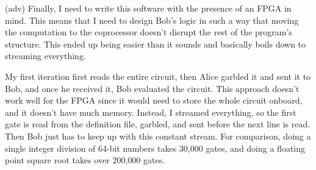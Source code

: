 \documentclass[14pt, table]{beamer}
\begin{document}
{(adv) Finally, I need to write this software with the presence of an FPGA in mind. This means that I need to design Bob's logic in such a way that moving the computation to the coprocessor doesn't disrupt the rest of the program's structure. This ended up being easier than it sounds and basically boils down to streaming everything.

My first iteration first reads the entire circuit, then Alice garbled it and sent it to Bob, and once he received it, Bob evaluated the circuit. This approach doesn't work well for the FPGA since it would need to store the whole circuit onboard, and it doesn't have much memory. Instead, I streamed everything, so the first gate is read from the definition file, garbled, and sent before the next line is read. Then Bob just has to keep up with this constant stream. For comparison, doing a single integer division of 64-bit numbers takes 30,000 gates, and doing a floating point square root takes over 200,000 gates.

}
\end{document}
